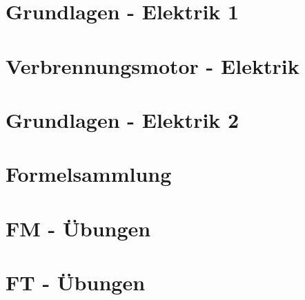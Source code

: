


\chapter{Grundlagen - Elektrik 1}
 \newpage
\chapter{Verbrennungsmotor - Elektrik}
 \newpage
\chapter{Grundlagen - Elektrik 2}
 \newpage


\chapter{Formelsammlung}
 \newpage


\chapter{FM - Übungen}
 \newpage
 \newpage
 \newpage
 \newpage
 \newpage
 \newpage
 \newpage
 \newpage
 \newpage
 \newpage
 \newpage
 \newpage
 \newpage


\chapter{FT - Übungen}
 \newpage
 \newpage




